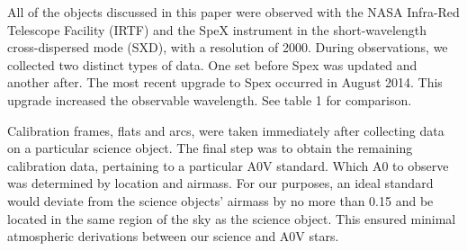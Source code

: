 
All of the objects discussed in this paper were observed with the NASA Infra-Red Telescope Facility (IRTF) and the SpeX instrument \cite{Rayner_1998} in the short-wavelength cross-dispersed mode (SXD), with a resolution of 2000.  During observations, we collected two distinct types of data.  One set before Spex was updated and another after.  The most recent upgrade to Spex occurred in August 2014.  This upgrade increased the observable wavelength.  See table 1 for comparison.


Calibration frames, flats and arcs, were taken immediately after collecting data on a particular science object.  The final step was to obtain the remaining calibration data, pertaining to a particular A0V standard.  Which A0 to observe was determined by location and airmass.  For our purposes, an ideal standard would deviate from the science objects' airmass by no more than 0.15 and be located in the same region of the sky as the science object.  This ensured minimal atmospheric derivations between our science and A0V stars.
